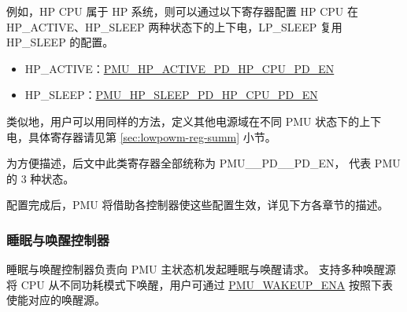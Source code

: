 \documentclass[main\_\_CN.tex]{subfiles}
\begin{document}
例如，HP CPU 属于 HP 系统，则可以通过以下寄存器配置 HP CPU 在 HP\_ACTIVE、HP\_SLEEP 两种状态下的上下电，LP\_SLEEP 复用 HP\_SLEEP 的配置。

\begin{itemize}
    \item HP\_ACTIVE：\hyperref[fielddesc:PMUHPACTIVEPDHPCPUPDEN]{PMU\_HP\_ACTIVE\_PD\_HP\_CPU\_PD\_EN}
    \item HP\_SLEEP：\hyperref[fielddesc:PMUHPSLEEPPDHPCPUPDEN]{PMU\_HP\_SLEEP\_PD\_HP\_CPU\_PD\_EN}
\end{itemize}

类似地，用户可以用同样的方法，定义其他电源域在不同 PMU 状态下的上下电，具体寄存器请见第 \ref{sec:lowpowm-reg-summ} 小节。

\begin{tiplisting}
为方便描述，后文中此类寄存器全部统称为 PMU\_\_PD\_\_PD\_EN， 代表 PMU 的 3 种状态。
\end{tiplisting}

配置完成后，PMU 将借助各控制器使这些配置生效，详见下方各章节的描述。

\subsubsection{睡眠与唤醒控制器}

睡眠与唤醒控制器负责向 PMU 主状态机发起睡眠与唤醒请求。\chipname{} 支持多种唤醒源将 CPU 从不同功耗模式下唤醒，用户可通过 \hyperref[fielddesc:PMUWAKEUPENA]{PMU\_WAKEUP\_ENA} 按照下表使能对应的唤醒源。
\end{document}
